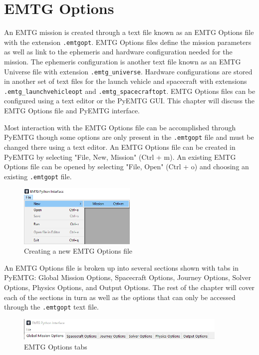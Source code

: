 \chapter{EMTG Options}
\label{chap:options}
An \ac{EMTG} mission is created through a text file known as an \ac{EMTG} Options file with the extension \verb|.emtgopt|. \ac{EMTG} Options files define the mission parameters as well as link to the ephemeris and hardware configuration needed for the mission. The ephemeris configuration is another text file known as an \ac{EMTG} Universe file with extension \verb|.emtg_universe|. Hardware configurations are stored in another set of text files for the launch vehicle and spacecraft with extensions \verb|.emtg_launchvehicleopt| and \verb|.emtg_spacecraftopt|. \ac{EMTG} Options files can be configured using a text editor or the PyEMTG \ac{GUI}. This chapter will discuss the \ac{EMTG} Options file and PyEMTG interface.

\noindent Most interaction with the \ac{EMTG} Options file can be accomplished through PyEMTG though some options are only present in the \verb|.emtgopt| file and must be changed there using a text editor. An \ac{EMTG} Options file can be created in PyEMTG by selecting "File, New, Mission" (Ctrl + m). An existing \ac{EMTG} Options file can be opened by selecting "File, Open" (Ctrl + o) and choosing an existing \verb|.emtgopt| file.

\begin{figure}[H]
    \centering
    \includegraphics[width=0.5\textwidth]{../../shared_latex_inputs/images/pyemtg_file_new.png}
    \caption{Creating a new EMTG Options file}
\end{figure}

\noindent An \ac{EMTG} Options file is broken up into several sections shown with tabs in PyEMTG: Global Mission Options, Spacecraft Options, Journey Options, Solver Options, Physics Options, and Output Options. The rest of the chapter will cover each of the sections in turn as well as the options that can only be accessed through the \verb|.emtgopt| text file.

\begin{figure}[H]
    \centering
    \includegraphics[width=0.9\textwidth]{../../shared_latex_inputs/images/pyemtg_options_tabs.png}
    \caption{EMTG Options tabs}
\end{figure}